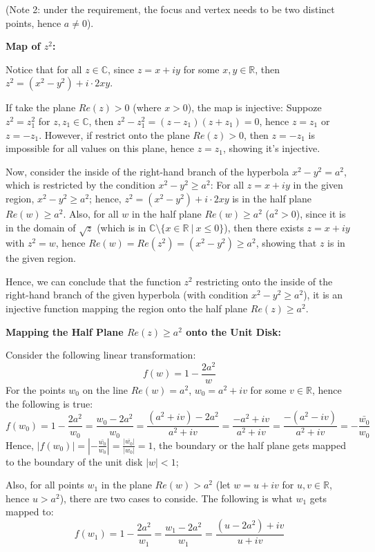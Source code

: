 \documentclass{article}
\begin{document}
(Note 2: under the requirement, the focus and vertex needs to be two distinct points, hence $a\neq 0$).

\hfill

\textbf{Map of $z^2$:}

Notice that for all $z\in\mathbb{C}$, since $z=x+iy$ for some $x,y\in\mathbb{R}$, then $z^2=(x^2-y^2)+i\cdot 2xy$.

If take the plane $Re(z)>0$ (where $x>0$), the map is injective: Suppoze $z^2=z_1^2$ for $z,z_1\in\mathbb{C}$, 
then $z^2-z_1^2=(z-z_1)(z+z_1)=0$, hence $z=z_1$ or $z=-z_1$. However, if restrict onto the plane $Re(z)>0$, then $z=-z_1$ is impossible for all values on this plane, hence $z=z_1$, showing it's injective.

\hfill

Now, consider the inside of the right-hand branch of the hyperbola $x^2-y^2=a^2$, which is restricted by the condition $x^2-y^2\geq a^2$:
For all $z=x+iy$ in the given region, $x^2-y^2\geq a^2$; hence, $z^2=(x^2-y^2)+i\cdot 2xy$ is in the half plane $Re(w)\geq a^2$.
Also, for all $w$ in the half plane $Re(w)\geq a^2$ ($a^2>0$), since it is in the domain of $\sqrt{z}$ (which is in $\mathbb{C}\setminus\{x\in\mathbb{R}\ |\ x\leq 0\}$),
then there exists $z=x+iy$ with $z^2=w$, hence $Re(w)=Re(z^2)=(x^2-y^2)\geq a^2$, showing that $z$ is in the given region.

Hence, we can conclude that the function $z^2$ restricting onto the inside of the right-hand branch of the given hyperbola (with condition $x^2-y^2\geq a^2$),
it is an injective function mapping the region onto the half plane $Re(z)\geq a^2$.

\hfill

\textbf{Mapping the Half Plane $Re(z)\geq a^2$ onto the Unit Disk:}

Consider the following linear transformation:
$$f(w)=1-\frac{2a^2}{w}$$
For the points $w_0$ on the line $Re(w)=a^2$, $w_0=a^2+iv$ for some $v\in\mathbb{R}$, hence the following is true:
$$f(w_0)=1-\frac{2a^2}{w_0}=\frac{w_0-2a^2}{w_0}=\frac{(a^2+iv)-2a^2}{a^2+iv}=\frac{-a^2+iv}{a^2+iv} = \frac{-(a^2-iv)}{a^2+iv} = -\frac{\bar{w_0}}{w_0}$$
Hence, $|f(w_0)|=\left|-\frac{\bar{w_0}}{w_0}\right|=\frac{|\bar{w_0}|}{|w_0|}=1$, the boundary or the half plane gets mapped to the boundary of the unit disk $|w|<1$;

Also, for all points $w_1$ in the plane $Re(w)>a^2$ (let $w=u+iv$ for $u,v\in \mathbb{R}$, hence $u>a^2$), there are two cases to conside.
The following is what $w_1$ gets mapped to:
$$f(w_1)=1-\frac{2a^2}{w_1}=\frac{w_1-2a^2}{w_1}=\frac{(u-2a^2)+iv}{u+iv}$$
\end{document}
